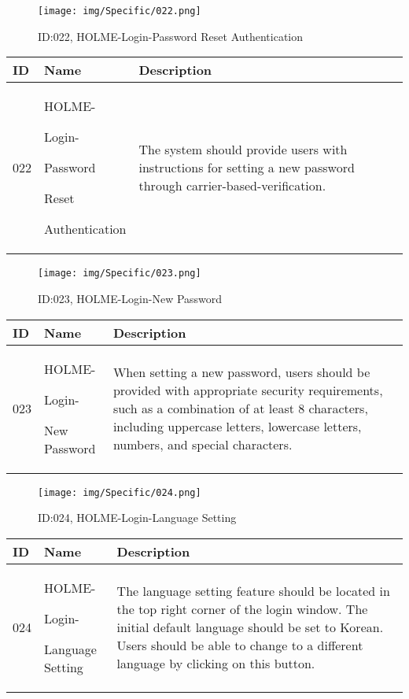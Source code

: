 \documentclass[conference]{IEEEtran}
\begin{document}
\begin{enumerate}
\begin{figure}[h]
\centering
\texttt{[image: img/Specific/022.png]}
\caption{ID:022, HOLME-Login-Password Reset Authentication}
\end{figure}
\begin{table}[h]
\def\arraystretch{1.2} \small
    \begin{tabular}{|p{1cm}|p{1.8cm}|p{5.0cm}|}
        \hline
        ID & Name & Description\\ \hline
         022 \par  & HOLME-\par Login-\par Password \par Reset \par Authentication &The system should provide users with instructions for setting a new password through carrier-based-verification.\\ \hline
    \end{tabular}
\end{table}

\begin{figure}[h]
\centering
\texttt{[image: img/Specific/023.png]}
\caption{ID:023, HOLME-Login-New Password}
\end{figure}
\begin{table}[h]
\def\arraystretch{1.2} \small
    \begin{tabular}{|p{1cm}|p{1.8cm}|p{5.0cm}|}
        \hline
        ID & Name & Description\\ \hline
         023 \par  & HOLME-\par Login-\par New Password&When setting a new password, users should be provided with appropriate security requirements, such as a combination of at least 8 characters, including uppercase letters, lowercase letters, numbers, and special characters.\\ \hline
    \end{tabular}
\end{table}

\begin{figure}[h]
\centering
\texttt{[image: img/Specific/024.png]}
\caption{ID:024, HOLME-Login-Language Setting}
\end{figure}
\begin{table}[h]
\def\arraystretch{1.2} \small
    \begin{tabular}{|p{1cm}|p{1.8cm}|p{5.0cm}|}
        \hline
        ID & Name & Description\\ \hline
         024 \par  & HOLME-\par Login-\par Language Setting &The language setting feature should be located in the top right corner of the login window. The initial default language should be set to Korean. Users should be able to change to a different language by clicking on this button.\\ \hline
    \end{tabular}
\end{table}


\end{enumerate}
\end{document}
